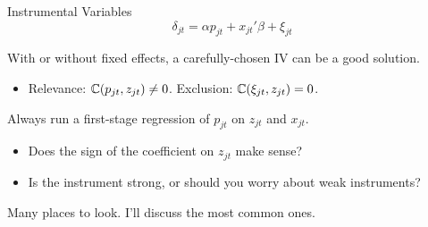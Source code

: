 \documentclass[aspectratio=169,t,11pt,table]{beamer}
\begin{document}
\begin{frame}{Instrumental Variables}
    \vspace{-\baselineskip}
    \begin{equation*}
        \delta_{jt} = \alpha p_{jt} + x_{jt}'\beta + \xi_{jt}
    \end{equation*}
    \vspace{-0.5\baselineskip}
    \begin{wideitemize}
        \item With or without fixed effects, a carefully-chosen IV can be a good solution.
        \begin{itemize}
            \item Relevance: $\mathbb{C}(p_{jt}, z_{jt}) \neq 0$. Exclusion: $\mathbb{C}(\xi_{jt}, z_{jt}) = 0$.
        \end{itemize}
        \pause
        \item Always run a first-stage regression of $p_{jt}$ on $z_{jt}$ and $x_{jt}$.
        \begin{itemize}
            \item Does the sign of the coefficient on $z_{jt}$ make sense?
            \item Is the instrument strong, or should you worry about weak instruments?
        \end{itemize}
        \pause
        \item Many places to look. I'll discuss the most common ones.
    \end{wideitemize}
\end{frame}
\end{document}
